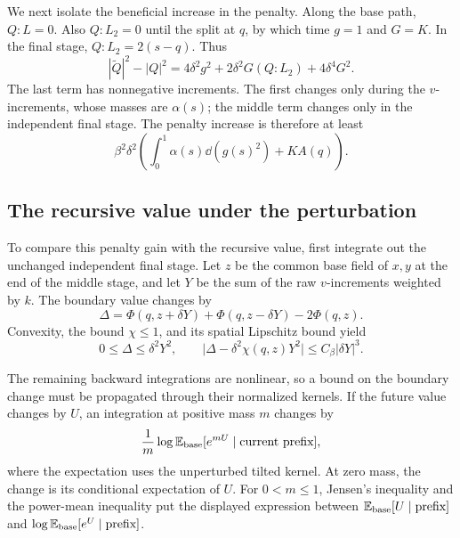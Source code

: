 We next isolate the beneficial increase in the penalty. Along the
base path, $Q:L=0$. Also $Q:L_2=0$ until the split at $q$, by which
time $g=1$ and $G=K$. In the final stage, $Q:L_2=2(s-q)$. Thus
\[
 |\widetilde Q|^2-|Q|^2
 =4\delta^2g^2+2\delta^2G(Q:L_2)+4\delta^4G^2.
\]
The last term has nonnegative increments. The first changes only
during the $v$-increments, whose masses are $\alpha(s)$; the middle
term changes only in the independent final stage. The penalty
increase is therefore at least
\begin{equation}
\label{static-eq:locking-penalty}
 \beta^2\delta^2\left(
     \int_0^1\alpha(s)\dd(g(s)^2)+K A(q)\right).
\end{equation}

\subsection{The recursive value under the perturbation}

To compare this penalty gain with the recursive value, first integrate
out the unchanged independent final stage. Let $z$ be the common base
field of $x,y$ at the end of the middle stage, and let $Y$ be the sum
of the raw $v$-increments weighted by $k$. The boundary value changes by
\begin{equation}
\label{static-eq:locking-boundary-increment}
 \Delta=\Phi(q,z+\delta Y)+\Phi(q,z-\delta Y)-2\Phi(q,z).
\end{equation}
Convexity, the bound $\chi\leq1$, and its spatial Lipschitz bound yield
\begin{equation}
\label{static-eq:locking-taylor}
 0\leq\Delta\leq\delta^2Y^2,
 \qquad
 \bigl|\Delta-\delta^2\chi(q,z)Y^2\bigr|
 \leq C_\beta|\delta Y|^3.
\end{equation}

The remaining backward integrations are nonlinear, so a bound on the
boundary change must be propagated through their normalized kernels.
If the future value changes by $U$, an integration at positive mass
$m$ changes by
\[
 \frac1m\log\mathbb E_{\rm base}
              [e^{mU}\mid\text{current prefix}],
\]
where the expectation uses the unperturbed tilted kernel. At zero
mass, the change is its conditional expectation of $U$. For
$0<m\leq1$, Jensen's inequality and the power-mean inequality put
the displayed expression between
$\mathbb E_{\rm base}[U\mid\text{prefix}]$ and
$\log\mathbb E_{\rm base}[e^U\mid\text{prefix}]$.

